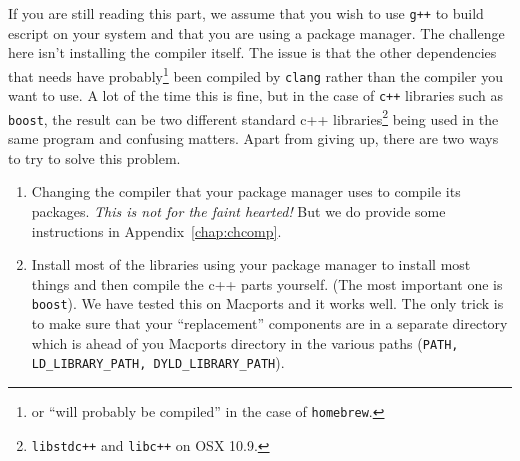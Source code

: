 If you are still reading this part, we assume that you wish to use \texttt{g++} to build escript on your system and that you are 
using a package manager.
The challenge here isn't installing the compiler itself. 
The issue is that the other dependencies that \escript needs have 
probably\footnote{or ``will probably be compiled'' in the case of \texttt{homebrew}.} been compiled by \texttt{clang} rather than the compiler 
you want to use.
A lot of the time this is fine, but in the case of \texttt{c++} libraries such as \texttt{boost}, the result can be two different 
standard c++ libraries\footnote{\texttt{libstdc++} and \texttt{libc++} on OSX 10.9.} being used in the same program and confusing matters.
Apart from giving up, there are two ways to try to solve this problem.
\begin{enumerate}
\item Changing the compiler that your package manager uses to compile its packages.
\emph{This is not for the faint hearted!} But we do provide some instructions in Appendix~\ref{chap:chcomp}.
\item Install most of the libraries using your package manager to install most things and then compile the c++ parts yourself.
(The most important one is \texttt{boost}).
We have tested this on Macports and it works well. The only trick is to make sure that your ``replacement'' components are in a separate 
directory which is ahead of you Macports directory in the various paths (\texttt{PATH, LD\_LIBRARY\_PATH, DYLD\_LIBRARY\_PATH}).
\end{enumerate}






